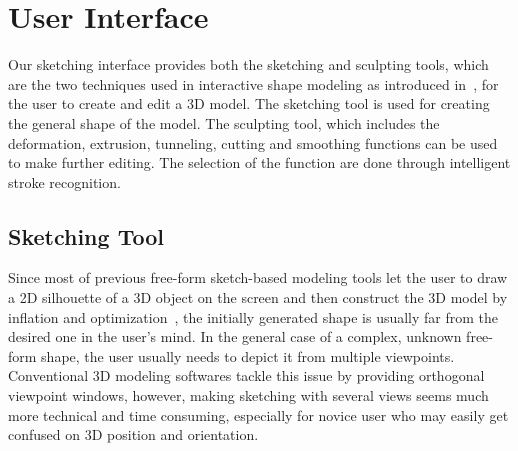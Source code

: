 \section{User Interface}\label{ch3:sec:ui}

Our sketching interface provides both the sketching and sculpting tools, which are the two techniques used in interactive shape modeling as introduced in~\cite{CIW08}, for the user to create and edit a 3D model. The sketching tool is used for creating the general shape of the model. The sculpting tool, which includes the deformation, extrusion, tunneling, cutting and smoothing functions can be used to make further editing. The selection of the function are done through intelligent stroke recognition. 

\subsection{Sketching Tool}\label{ch3:sec:ui:creation}


Since most of previous free-form sketch-based modeling tools let the user to draw a 2D silhouette of a 3D object on the screen and then construct the 3D model by inflation and optimization~\cite{IMT99,KHR02,NISA07}, the initially generated shape is usually far from the desired one in the user's mind. In the general case of a complex, unknown free-form shape, the user usually needs to depict it from multiple viewpoints. Conventional 3D modeling softwares tackle this issue by providing orthogonal viewpoint windows, however, making sketching with several views seems much more technical and time consuming, especially for novice user who may easily get confused on 3D position and orientation. 

